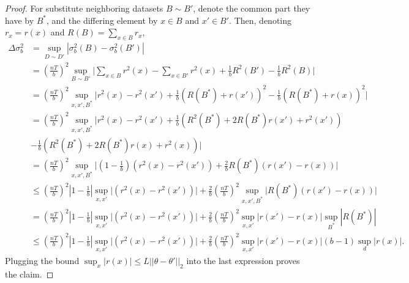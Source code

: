 \documentclass[english,twoside,openright]{HYgraduMLDS}
\begin{document}
\begin{proof}
    For substitute neighboring datasets \(B \sim B'\), denote the
    common part they have by \(B^*\), and the differing element by \(x\in B\)
    and \(x'\in B'\). Then, denoting \(r_{x} = r(x)\) and \(R(B) = \sum_{x\in B}r_{x}\),
    \begin{align*}
        \Delta \sigma^2_b &= \sup_{D\sim D'} |\sigma^2_b(B) - \sigma^2_b(B')|
        \\&= \left(\frac{nT}{b}\right)^2 \sup_{B\sim B'}\Big|
        \sum_{x\in B}r^2(x) - \sum_{x\in B'}r^2(x)
        + \frac{1}{b}R^2(B') - \frac{1}{b}R^2(B)\Big|
        \\&= \left(\frac{nT}{b}\right)^2 \sup_{x, x', B^*}\Big|
        r^2(x) - r^2(x')
        + \frac{1}{b}(R(B^*) + r(x'))^2 - \frac{1}{b}(R(B^*) + r(x))^2\Big|
        \\&= \left(\frac{nT}{b}\right)^2 \sup_{x, x', B^*}\Big|
        r^2(x) - r^2(x')
        + \frac{1}{b}(R^2(B^*) + 2R(B^*)r(x') + r^2(x'))
        \\&- \frac{1}{b}(R^2(B^*) + 2R(B^*)r(x) + r^2(x))\Big|
        \\&= \left(\frac{nT}{b}\right)^2 \sup_{x, x', B^*}\Big|
        \left(1 - \frac{1}{b}\right)(r^2(x) - r^2(x'))
        + \frac{2}{b}R(B^*)(r(x') - r(x))\Bigg|
        \\&\leq \left(\frac{nT}{b}\right)^2 \left|1 - \frac{1}{b}\right|
        \sup_{x, x'}\Big|(r^2(x) - r^2(x'))\Big|
        + \frac{2}{b}\left(\frac{nT}{b}\right)^2 \sup_{x, x', B^*}\Big|
        R(B^*)(r(x') - r(x))\Bigg|
        \\&= \left(\frac{nT}{b}\right)^2 \left|1 - \frac{1}{b}\right|
        \sup_{x, x'}\Big|(r^2(x) - r^2(x'))\Big|
        + \frac{2}{b}\left(\frac{nT}{b}\right)^2
        \sup_{x, x'}|r(x') - r(x)|
        \sup_{B^*}|R(B^*)|
        \\&\leq \left(\frac{nT}{b}\right)^2 \left|1 - \frac{1}{b}\right|
        \sup_{x, x'}\Big|(r^2(x) - r^2(x'))\Big|
        + \frac{2}{b}\left(\frac{nT}{b}\right)^2
        \sup_{x, x'}|r(x') - r(x)|(b - 1)\sup_{d}|r(x)|.
    \end{align*}
    Plugging the bound \(\sup_x |r(x)| \leq L||\theta - \theta'||_2\) 
    into the last expression proves the claim.
\end{proof}
\end{document}
